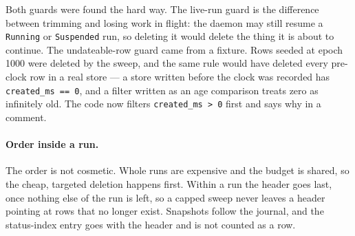 \begin{center}
\end{center}

Both guards were found the hard way. The live-run guard is the difference between trimming and
losing work in flight: the daemon may still resume a \texttt{Running} or \texttt{Suspended}
run, so deleting it would delete the thing it is about to continue. The undateable-row guard
came from a fixture. Rows seeded at epoch 1000 were deleted by the sweep, and the same rule
would have deleted every pre-clock row in a real store --- a store written before the clock
was recorded has \texttt{created\_ms == 0}, and a filter written as an age comparison treats
zero as infinitely old. The code now filters \texttt{created\_ms > 0} first and says why in a
comment.

\paragraph{Order inside a run.} The order is not cosmetic. Whole runs are expensive and the
budget is shared, so the cheap, targeted deletion happens first. Within a run the header goes
last, once nothing else of the run is left, so a capped sweep never leaves a header pointing
at rows that no longer exist. Snapshots follow the journal, and the status-index entry goes
with the header and is not counted as a row.

